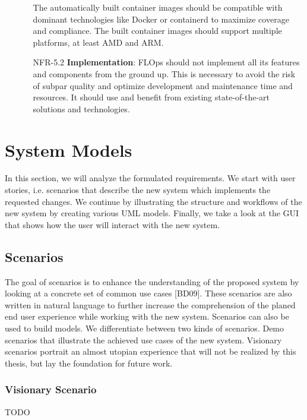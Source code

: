 \begin{itemize}
\begin{itemize}
                The automatically built container images should be compatible with dominant technologies like Docker or containerd to maximize coverage and compliance.
                The built container images should support multiple platforms, at least AMD and ARM.
            \item [NFR-5.2] {\textbf{Implementation}}:
                FLOps should not implement all its features and components from the ground up.
                This is necessary to avoid the risk of subpar quality and optimize development and maintenance time and resources.
                It should use and benefit from existing state-of-the-art solutions and technologies.
        \end{itemize}
\end{itemize}




\section{System Models}

In this section, we will analyze the formulated requirements. We start with user stories, i.e. scenarios that describe the new system which implements the requested changes.
We continue by illustrating the structure and workflows of the new system by creating various UML models.
Finally, we take a look at the GUI that shows how the user will interact with the new system.

\subsection{Scenarios}

The goal of scenarios is to enhance the understanding of the proposed system by looking at a concrete set of common use cases [BD09].
These scenarios are also written in natural language to further increase the comprehension of the planed end user experience while working with the new system.
Scenarios can also be used to build models. We differentiate between two kinds of scenarios.
Demo scenarios that illustrate the achieved use cases of the new system.
Visionary scenarios portrait an almost utopian experience that will not be realized by this thesis, but lay the foundation for future work.

\subsubsection{Visionary Scenario}
TODO

